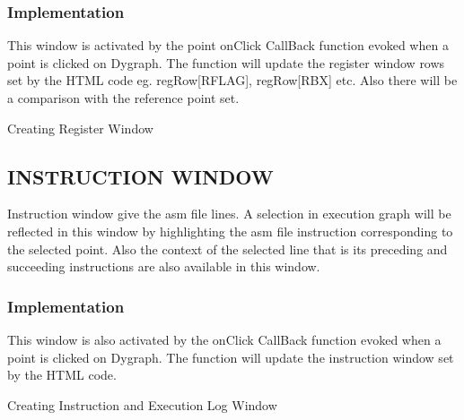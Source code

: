 \subsubsection{Implementation}

This window is activated by the point onClick CallBack function evoked when a point is clicked on Dygraph. The function will update the register window rows set by the HTML code eg. regRow[RFLAG], regRow[RBX] etc. Also there will be a comparison with the reference point set. 

\IncMargin{1em}
\begin{algorithm}[H]
\DontPrintSemicolon
{} 
\BlankLine
{}
\caption{Creating Register Window}
\end{algorithm}\DecMargin{1em}

\subsection {INSTRUCTION WINDOW}

Instruction window give the asm file lines. A selection in execution graph will be reflected in this window by highlighting the asm file instruction corresponding to the selected point. Also the context of the selected line that is its preceding and succeeding instructions are also available in this window.
\subsubsection{Implementation}

This window is also activated by the onClick CallBack function evoked when a point is clicked on Dygraph. The function will update the instruction window set by the HTML code.

\IncMargin{1em}
\begin{algorithm}[H]
\DontPrintSemicolon
{} 
\caption{Creating Instruction and Execution Log Window}
\end{algorithm}\DecMargin{1em}


